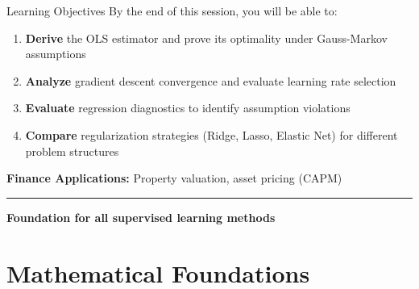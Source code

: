 \documentclass[8pt,aspectratio=169]{beamer}
\newcommand{\bottomnote}[1]{%
\vfill
\vspace{-2mm}
\textcolor{mllavender2}{\rule{\textwidth}{0.4pt}}
\vspace{1mm}
\footnotesize
\textbf{#1}
}
\begin{document}
\begin{frame}[t]{Learning Objectives}
  By the end of this session, you will be able to:

  \begin{enumerate}
    \item \textbf{Derive} the OLS estimator and prove its optimality under Gauss-Markov assumptions
    \item \textbf{Analyze} gradient descent convergence and evaluate learning rate selection
    \item \textbf{Evaluate} regression diagnostics to identify assumption violations
    \item \textbf{Compare} regularization strategies (Ridge, Lasso, Elastic Net) for different problem structures
  \end{enumerate}

  \vspace{0.5em}
  \textbf{Finance Applications:} Property valuation, asset pricing (CAPM)

  \bottomnote{Foundation for all supervised learning methods}
\end{frame}

\section{Mathematical Foundations}
\end{document}
